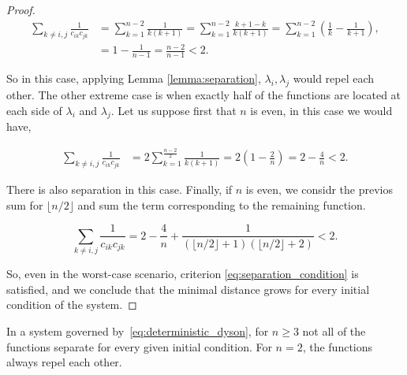 \begin{proof}
    \begin{align*}
        \sum_{k\neq i,j} \frac{1}{c_{ik}c_{jk}} &= \sum_{k=1}^{n-2} \frac{1}{k(k+1)} = \sum_{k=1}^{n-2} \frac{k+1 - k}{k(k+1)} = \sum_{k=1}^{n-2} \left( \frac{1}{k} - \frac{1}{k+1} \right),\\
        &= 1 - \frac{1}{n-1} = \frac{n-2}{n-1} < 2.
    \end{align*}

    So in this case, applying Lemma \ref{lemma:separation}, $\lambda_i,\lambda_j$ would repel each other. The other extreme case is when exactly half of the functions are located at each side of $\lambda_i$ and $\lambda_j$. Let us suppose first that $n$ is even, in this case we would have,

    \begin{align*}
        \sum_{k\neq i,j} \frac{1}{c_{ik}c_{jk}} &= 2 \sum_{k=1}^{\frac{n-2}{2}} \frac{1}{k(k+1)} = 2\left(1 - \frac{2}{n}\right) = 2 - \frac4n < 2.
    \end{align*}

    There is also separation in this case. Finally, if $n$ is even, we considr the previos sum for $\lfloor n/2 \rfloor$ and sum the term corresponding to the remaining function.

    \begin{equation*}
        \sum_{k\neq i,j} \frac{1}{c_{ik}c_{jk}} = 2 - \frac{4}{n} + \frac1{(\lfloor n/2\rfloor+1)(\lfloor n/2\rfloor +2)} < 2.
    \end{equation*}

    So, even in the worst-case scenario, criterion \eqref{eq:separation_condition} is satisfied, and we conclude that the minimal distance grows for every initial condition of the system.
\end{proof}

\begin{corollary} \label{corollary:hermite_not_all_repel}
    In a system governed by~\eqref{eq:deterministic_dyson}, for $n\ge3$ not all of the functions separate for every given initial condition. For $n =2$, the functions always repel each other.
\end{corollary}

